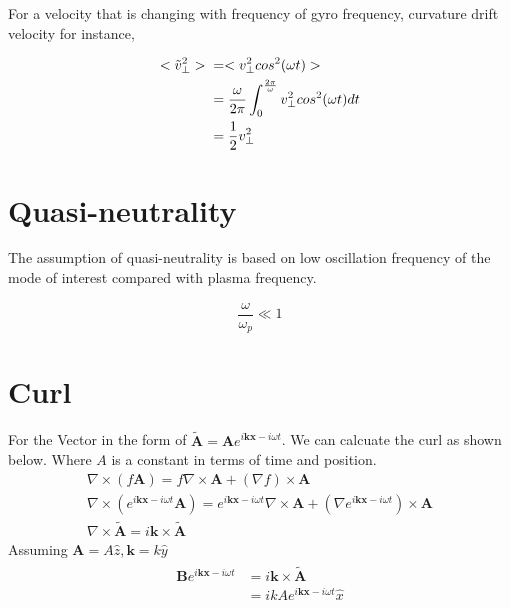 For a velocity that is changing with frequency of gyro frequency, curvature drift velocity for instance, \cite{Vd} \cite{iter_scale}

\begin{equation}
    \begin{aligned}
        <\Tilde{v}^2_{\perp}>{}&=<v^2_{\perp}cos^2(\omega t)>\\
        &=\frac{\omega}{2\pi}\int^{\frac{2\pi}{\omega} }_{0}v^2_{\perp}cos^2(\omega t) dt\\
        &=\frac{1}{2} v^2_{\perp}
    \end{aligned}
\end{equation}

    
\section{Quasi-neutrality}

The assumption of quasi-neutrality is based on low oscillation frequency of the mode of interest compared with plasma frequency. 

\begin{equation}
    \frac{\omega}{\omega_p} \ll 1
\end{equation}

\section{Curl}
    For the Vector in the form of $\widetilde{\textbf{A}}=\textbf{A} e^{i\textbf{kx}-i\omega t}$. We can calcuate the curl as shown below. Where $A$ is a constant in terms of time and position. 
    \begin{eqnarray}
        \nabla \times (f\textbf{A}) = f \nabla \times \textbf{A} +(\nabla f)\times \textbf{A}\\
        \nabla \times (e^{i\textbf{kx}-i\omega t}\textbf{A}) = e^{i\textbf{kx}-i\omega t} \nabla \times \textbf{A} +(\nabla e^{i\textbf{kx}-i\omega t})\times \textbf{A}\\
        \nabla \times \widetilde{\textbf{A}}=  i\textbf{k} \times \widetilde{\textbf{A}}
    \end{eqnarray}
    Assuming $\textbf{A}=A\hat{z}, \textbf{k}=k\hat{y}$
    \begin{eqnarray}
    \begin{aligned}
        \textbf{B}e^{i\textbf{kx}-i\omega t}{}&= i\textbf{k}\times \widetilde{\textbf{A}}\\
        &=ik A e^{i\textbf{kx}-i\omega t}\hat{x}
        \label{eq:curl}
    \end{aligned}
    \end{eqnarray}
    
